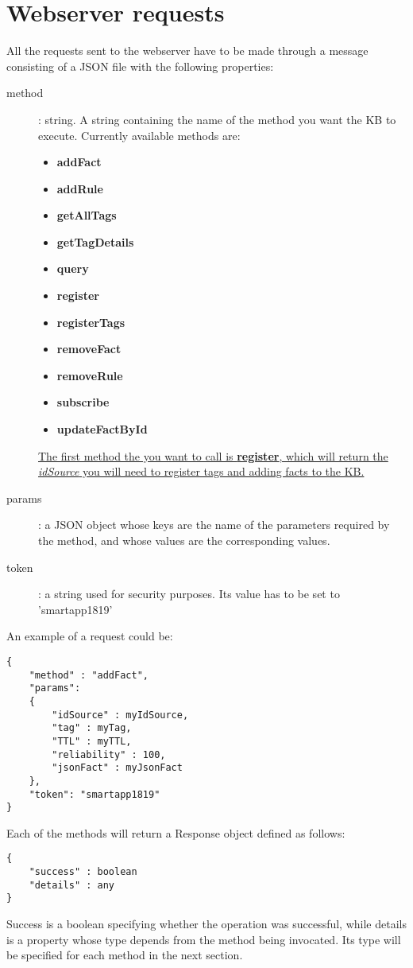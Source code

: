 \documentclass{article}
\begin{document}
\section{Webserver requests}
All the requests sent to the webserver have to be made through a message consisting of a JSON file with the following properties:
\begin{description}
    \item[method] : string. A string containing the name of the method you want the KB to execute. Currently available methods are:
    \begin{itemize}
        \item \textbf{addFact}
        \item \textbf{addRule}
        \item \textbf{getAllTags}
        \item \textbf{getTagDetails}
        \item \textbf{query}
        \item \textbf{register}
        \item \textbf{registerTags}
        \item \textbf{removeFact}
        \item \textbf{removeRule}
        \item \textbf{subscribe}
        \item \textbf{updateFactById}
    \end{itemize}
    \ul{The first method the you want to call is \textbf{register}, which will return the \textit{idSource} you will need to register tags and adding facts to the KB.}
    \item[params] : a JSON object whose keys are the name of the parameters required by the method, and whose values are the corresponding values.
    \item[token] : a string used for security purposes. Its value has to be set to 'smartapp1819'
\end{description}

An example of a request could be:
\begin{lstlisting}
{
    "method" : "addFact", 
    "params": 
    {
        "idSource" : myIdSource,
        "tag" : myTag,
        "TTL" : myTTL,
        "reliability" : 100,
        "jsonFact" : myJsonFact
    }, 
    "token": "smartapp1819"
}
\end{lstlisting}
Each of the methods will return a Response object defined as follows:
\begin{lstlisting}
{
    "success" : boolean
    "details" : any
}
\end{lstlisting}
Success is a boolean specifying whether the operation was successful, while details is a property whose type depends from the method being invocated. Its type will be specified for each method in the next section.
\\
\end{document}
